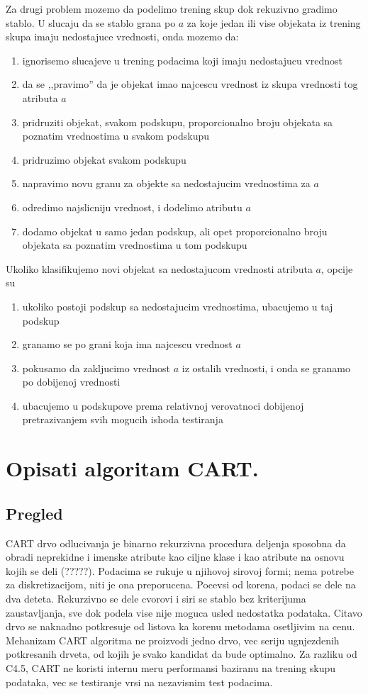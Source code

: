 \documentclass[a4paper]{article}
\begin{document}
Za drugi problem mozemo da podelimo trening skup dok rekuzivno gradimo stablo. U slucaju da se
stablo grana po \(a\) za koje jedan ili vise objekata iz trening skupa imaju nedostajuce vrednosti,
onda mozemo da:
\begin{enumerate}
    \item ignorisemo slucajeve u trening podacima koji imaju nedostajucu vrednost
    \item da se ,,pravimo'' da je objekat imao najcescu vrednost iz skupa vrednosti tog atributa
        \(a\)
    \item pridruziti objekat, svakom podskupu, proporcionalno broju objekata sa poznatim vrednostima
        u svakom podskupu
    \item pridruzimo objekat svakom podskupu
    \item napravimo novu granu za objekte sa nedostajucim vrednostima za \(a\)
    \item odredimo najslicniju vrednost, i dodelimo atributu \(a\)
    \item dodamo objekat u samo jedan podskup, ali opet proporcionalno broju objekata sa poznatim
        vrednostima u tom podskupu
\end{enumerate}

Ukoliko klasifikujemo novi objekat sa nedostajucom vrednosti atributa \(a\), opcije su
\begin{enumerate}
    \item ukoliko postoji podskup sa nedostajucim vrednostima, ubacujemo u taj podskup
    \item granamo se po grani koja ima najcescu vrednost \(a\)
    \item pokusamo da zakljucimo vrednost \(a\) iz ostalih vrednosti, i onda se granamo po dobijenoj
        vrednosti
    \item ubacujemo u podskupove prema relativnoj verovatnoci dobijenoj pretrazivanjem svih mogucih
        ishoda testiranja
\end{enumerate}

\section{Opisati algoritam CART.}
\subsection{Pregled}
CART drvo odlucivanja je binarno rekurzivna procedura deljenja sposobna da obradi neprekidne i
imenske atribute kao ciljne klase i kao atribute na osnovu kojih se deli (?????). Podacima se rukuje
u njihovoj sirovoj formi; nema potrebe za diskretizacijom, niti je ona preporucena. Pocevsi od
korena, podaci se dele na dva deteta. Rekurzivno se dele cvorovi i siri se stablo bez kriterijuma
zaustavljanja, sve dok podela vise nije moguca usled nedostatka podataka. Citavo drvo se naknadno
potkresuje od listova ka korenu metodama osetljivim na cenu. Mehanizam CART algoritma ne proizvodi
jedno drvo, vec seriju ugnjezdenih potkresanih drveta, od kojih je svako kandidat da bude optimalno.
Za razliku od C4.5, CART ne koristi internu meru performansi baziranu na trening skupu podataka, vec
se testiranje vrsi na nezavisnim test podacima.
\end{document}
